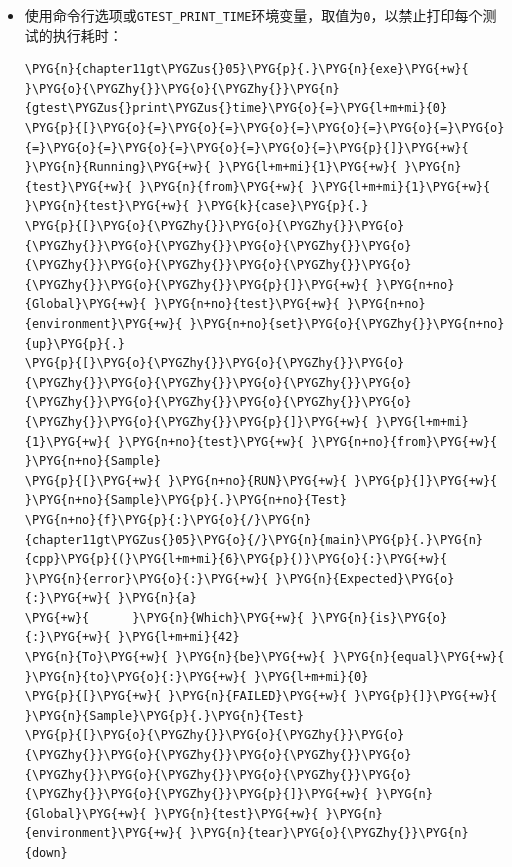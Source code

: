\begin{itemize}
\item 使用命令行选项或\texttt{GTEST\_\allowbreak{}PRINT\_\allowbreak{}TIME}环境变量，取值为\texttt{0}，以禁止打印每个测试的执行耗时：



\begin{codeblockbg}
\begin{Verbatim}[commandchars=\\\{\},breaklines=true,breakanywhere=true,fontsize=\codefont,xleftmargin=17bp]
\PYG{n}{chapter11gt\PYGZus{}05}\PYG{p}{.}\PYG{n}{exe}\PYG{+w}{ }\PYG{o}{\PYGZhy{}}\PYG{o}{\PYGZhy{}}\PYG{n}{gtest\PYGZus{}print\PYGZus{}time}\PYG{o}{=}\PYG{l+m+mi}{0}
\PYG{p}{[}\PYG{o}{=}\PYG{o}{=}\PYG{o}{=}\PYG{o}{=}\PYG{o}{=}\PYG{o}{=}\PYG{o}{=}\PYG{o}{=}\PYG{o}{=}\PYG{o}{=}\PYG{p}{]}\PYG{+w}{ }\PYG{n}{Running}\PYG{+w}{ }\PYG{l+m+mi}{1}\PYG{+w}{ }\PYG{n}{test}\PYG{+w}{ }\PYG{n}{from}\PYG{+w}{ }\PYG{l+m+mi}{1}\PYG{+w}{ }\PYG{n}{test}\PYG{+w}{ }\PYG{k}{case}\PYG{p}{.}
\PYG{p}{[}\PYG{o}{\PYGZhy{}}\PYG{o}{\PYGZhy{}}\PYG{o}{\PYGZhy{}}\PYG{o}{\PYGZhy{}}\PYG{o}{\PYGZhy{}}\PYG{o}{\PYGZhy{}}\PYG{o}{\PYGZhy{}}\PYG{o}{\PYGZhy{}}\PYG{o}{\PYGZhy{}}\PYG{o}{\PYGZhy{}}\PYG{p}{]}\PYG{+w}{ }\PYG{n+no}{Global}\PYG{+w}{ }\PYG{n+no}{test}\PYG{+w}{ }\PYG{n+no}{environment}\PYG{+w}{ }\PYG{n+no}{set}\PYG{o}{\PYGZhy{}}\PYG{n+no}{up}\PYG{p}{.}
\PYG{p}{[}\PYG{o}{\PYGZhy{}}\PYG{o}{\PYGZhy{}}\PYG{o}{\PYGZhy{}}\PYG{o}{\PYGZhy{}}\PYG{o}{\PYGZhy{}}\PYG{o}{\PYGZhy{}}\PYG{o}{\PYGZhy{}}\PYG{o}{\PYGZhy{}}\PYG{o}{\PYGZhy{}}\PYG{o}{\PYGZhy{}}\PYG{p}{]}\PYG{+w}{ }\PYG{l+m+mi}{1}\PYG{+w}{ }\PYG{n+no}{test}\PYG{+w}{ }\PYG{n+no}{from}\PYG{+w}{ }\PYG{n+no}{Sample}
\PYG{p}{[}\PYG{+w}{ }\PYG{n+no}{RUN}\PYG{+w}{ }\PYG{p}{]}\PYG{+w}{ }\PYG{n+no}{Sample}\PYG{p}{.}\PYG{n+no}{Test}
\PYG{n+no}{f}\PYG{p}{:}\PYG{o}{/}\PYG{n}{chapter11gt\PYGZus{}05}\PYG{o}{/}\PYG{n}{main}\PYG{p}{.}\PYG{n}{cpp}\PYG{p}{(}\PYG{l+m+mi}{6}\PYG{p}{)}\PYG{o}{:}\PYG{+w}{ }\PYG{n}{error}\PYG{o}{:}\PYG{+w}{ }\PYG{n}{Expected}\PYG{o}{:}\PYG{+w}{ }\PYG{n}{a}
\PYG{+w}{      }\PYG{n}{Which}\PYG{+w}{ }\PYG{n}{is}\PYG{o}{:}\PYG{+w}{ }\PYG{l+m+mi}{42}
\PYG{n}{To}\PYG{+w}{ }\PYG{n}{be}\PYG{+w}{ }\PYG{n}{equal}\PYG{+w}{ }\PYG{n}{to}\PYG{o}{:}\PYG{+w}{ }\PYG{l+m+mi}{0}
\PYG{p}{[}\PYG{+w}{ }\PYG{n}{FAILED}\PYG{+w}{ }\PYG{p}{]}\PYG{+w}{ }\PYG{n}{Sample}\PYG{p}{.}\PYG{n}{Test}
\PYG{p}{[}\PYG{o}{\PYGZhy{}}\PYG{o}{\PYGZhy{}}\PYG{o}{\PYGZhy{}}\PYG{o}{\PYGZhy{}}\PYG{o}{\PYGZhy{}}\PYG{o}{\PYGZhy{}}\PYG{o}{\PYGZhy{}}\PYG{o}{\PYGZhy{}}\PYG{o}{\PYGZhy{}}\PYG{o}{\PYGZhy{}}\PYG{p}{]}\PYG{+w}{ }\PYG{n}{Global}\PYG{+w}{ }\PYG{n}{test}\PYG{+w}{ }\PYG{n}{environment}\PYG{+w}{ }\PYG{n}{tear}\PYG{o}{\PYGZhy{}}\PYG{n}{down}

\end{Verbatim}
\end{codeblockbg}
\end{itemize}
